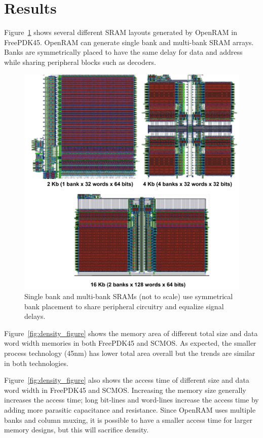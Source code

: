 \section{Results}
\label{sec:results}

Figure~\ref{fig:layout} shows several different SRAM layouts
generated by OpenRAM in FreePDK45. OpenRAM can generate single
bank and multi-bank SRAM arrays. Banks are
symmetrically placed to have the same delay for data and address
while sharing peripheral blocks such as decoders.
\begin{figure}[tb]
\centering
\includegraphics[scale=.4]{./figs/layout.pdf}
\caption{Single bank and multi-bank SRAMs (not to scale) use
  symmetrical bank placement to share peripheral circuitry and
  equalize signal delays.}
\label{fig:layout}
\end{figure}

Figure~\ref{fig:density_figure} shows the memory area of different
total size and data word width memories in both FreePDK45 and
SCMOS. As expected, the smaller process technology (45nm) has lower
total area overall but the trends are similar in both technologies.

Figure~\ref{fig:density_figure} also shows the access time of
different size and data word width in FreePDK45 and SCMOS. Increasing
the memory size generally increases the access time; long bit-lines
and word-lines increase the access time by adding more parasitic
capacitance and resistance.  Since OpenRAM uses multiple banks and
column muxing, it is possible to have a smaller access time for larger
memory designs, but this will sacrifice density.

